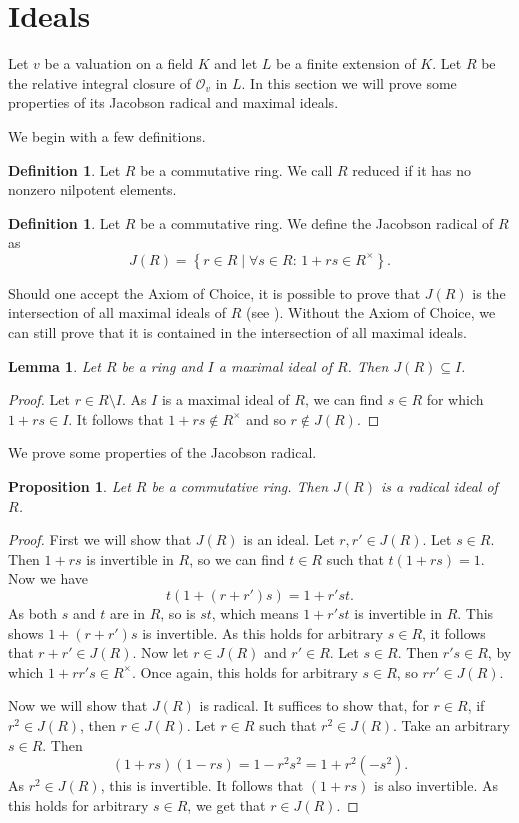 \documentclass[12pt,a4paper]{amsart}
\newtheorem{prop}[thm]{Proposition}
\newtheorem{lem}[thm]{Lemma}
\theoremstyle{definition}
\newtheorem{de}[thm]{Definition}
\begin{document}
\section{Ideals}
Let $v$ be a valuation on a field $K$ and let $L$ be a finite extension of $K$.
Let $R$ be the relative integral closure of $\mathcal{O}_v$ in $L$.
In this section we will prove some properties of its Jacobson radical and maximal ideals.

We begin with a few definitions.
\begin{de}
Let $R$ be a commutative ring.
We call $R$ reduced if it has no nonzero nilpotent elements.
\end{de}
\begin{de}
Let $R$ be a commutative ring. We define the Jacobson radical of $R$ as
$$J(R)=\left\{r\in R\mid\forall s\in R:\, 1+rs\in R^{\times}\right\}.$$
\end{de}
Should one accept the Axiom of Choice, it is possible to prove that $J(R)$ is the intersection of all maximal ideals of $R$ (see \cite[page 751]{dummit2004}).
Without the Axiom of Choice, we can still prove that it is contained in the intersection of all maximal ideals.
\begin{lem}{\label{in}}
Let $R$ be a ring and $I$ a maximal ideal of $R$.
Then $J(R)\subseteq I$.
\end{lem}
\begin{proof}
Let $r\in R\setminus I$.
As $I$ is a maximal ideal of $R$, we can find $s\in R$ for which $1+rs\in I$.
It follows that $1+rs\notin R^{\times}$ and so $r\notin J(R)$.
\end{proof}
We prove some properties of the Jacobson radical.
\begin{prop}{\label{rad}}
Let $R$ be a commutative ring.
Then $J(R)$ is a radical ideal of $R$.
\end{prop}
\begin{proof}
First we will show that $J(R)$ is an ideal.
Let $r,r'\in J(R)$.
Let $s\in R$.
Then $1+rs$ is invertible in $R$, so we can find $t\in R$ such that $t(1+rs)=1$.
Now we have
$$t(1+(r+r')s)=1+r'st.$$
As both $s$ and $t$ are in $R$, so is $st$, which means $1+r'st$ is invertible in $R$.
This shows $1+(r+r')s$ is invertible. As this holds for arbitrary $s\in R$, it follows that $r+r'\in J(R)$.
Now let $r\in J(R)$ and $r'\in R$.
Let $s\in R$.
Then $r's\in R$, by which $1+rr's\in R^{\times}$.
Once again, this holds for arbitrary $s\in R$, so $rr'\in J(R)$.

Now we will show that $J(R)$ is radical.
It suffices to show that, for $r\in R$, if $r^2\in J(R)$, then $r\in J(R)$.
Let $r\in R$ such that $r^2\in J(R)$.
Take an arbitrary $s\in R$. Then
$$(1+rs)(1-rs)=1-r^2s^2=1+r^2\left(-s^2\right).$$
As $r^2\in J(R)$, this is invertible.
It follows that $(1+rs)$ is also invertible.
As this holds for arbitrary $s\in R$, we get that $r\in J(R)$.
\end{proof}
\end{document}
